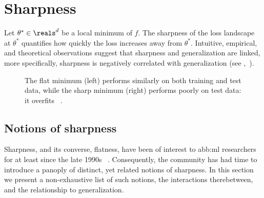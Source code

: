 \section{Sharpness}\label{sec:sharpness}

Let \(\theta^{\ast}\in\reals^{d}\) be a local minimum of \(f\).
The sharpness of the loss landscape at \(\theta^{\ast}\)
quantifies how quickly the loss increases away from \(\theta^{\ast}\).
Intuitive, empirical, and theoretical observations suggest that
sharpness and generalization are linked,
more specifically, sharpness is negatively correlated with generalization
(see ,~\citealt{keskarLargeBatchTrainingDeep2022}).
\begin{figure}[htb]
	\begin{center}
	\end{center}
	\caption{%
		The flat minimum (left) performs similarly on both training and test data,
		while the sharp minimum (right) performs poorly on test data: it overfits%
		~\cite{keskarLargeBatchTrainingDeep2022}.
	}\label{fig:sharpvflat}
\end{figure}

\subsection{Notions of sharpness}\label{sub:sharpness:notions}

Sharpness, and its converse, flatness,
have been of interest to \gls{abb:ml} researchers for at least since the late 1990s%
~\cite{hochreiterFlatMinima1997}.
Consequently, the community has had time to introduce a panoply
of distinct, yet related notions of sharpness.
In this section we present a non-exhaustive list of such notions,
the interactions therebetween, and the relationship to generalization.

